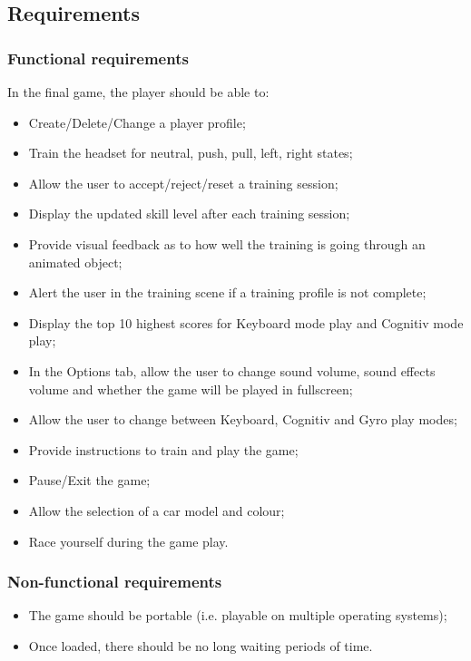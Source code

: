 \subsection{Requirements}

\subsubsection{Functional requirements}
In the final game, the player should be able to: 
\begin{itemize}
	\item Create/Delete/Change a player profile;
	\item Train the headset for neutral, push, pull, left, right states;
	\item Allow the user to accept/reject/reset a training session;
	\item Display the updated skill level after each training session;
	\item Provide visual feedback as to how well the training is going through an animated object;
	\item Alert the user in the training scene if a training profile is not complete;
	\item Display the top 10 highest scores for Keyboard mode play and Cognitiv mode play;
	\item In the Options tab, allow the user to change sound volume, sound effects volume and whether the game will be played in fullscreen;
	\item Allow the user to change between Keyboard, Cognitiv and Gyro play modes;
	\item Provide instructions to train and play the game;
	\item Pause/Exit the game;
	\item Allow the selection of a car model and colour;
	\item Race yourself during the game play.
\end{itemize}

\subsubsection{Non-functional requirements}
\begin{itemize}
	\item The game should be portable (i.e. playable on multiple operating systems);
	\item Once loaded, there should be no long waiting periods of time.
\end{itemize}

